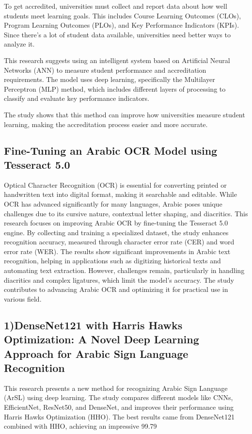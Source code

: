 \documentclass{article}
\begin{document}
To get accredited, universities must collect and report data about how well students meet learning goals. This includes Course Learning Outcomes (CLOs), Program Learning Outcomes (PLOs), and Key Performance Indicators (KPIs). Since there's a lot of student data available, universities need better ways to analyze it.

This research suggests using an intelligent system based on Artificial Neural Networks (ANN) to measure student performance and accreditation requirements. The model uses deep learning, specifically the Multilayer Perceptron (MLP) method, which includes different layers of processing to classify and evaluate key performance indicators.

The study shows that this method can improve how universities measure student learning, making the accreditation process easier and more accurate.
\subsection{Fine-Tuning an Arabic OCR Model using
					Tesseract 5.0}
Optical Character Recognition (OCR) is essential for converting printed or handwritten text into digital format, making it searchable and editable. While OCR has advanced significantly for many languages, Arabic poses unique challenges due to its cursive nature, contextual letter shaping, and diacritics. This research focuses on improving Arabic OCR by fine-tuning the Tesseract 5.0 engine. By collecting and training a specialized dataset, the study enhances recognition accuracy, measured through character error rate (CER) and word error rate (WER). The results show significant improvements in Arabic text recognition, helping in applications such as digitizing historical texts and automating text extraction. However, challenges remain, particularly in handling diacritics and complex ligatures, which limit the model's accuracy. The study contributes to advancing Arabic OCR and optimizing it for practical use in various field.

\subsection{1)DenseNet121 with Harris Hawks Optimization: A Novel Deep Learning Approach for Arabic Sign
						Language Recognition}
This research presents a new method for recognizing Arabic Sign Language (ArSL) using deep learning. The study compares different models like CNNs, EfficientNet, ResNet50, and DenseNet, and improves their performance using Harris Hawks Optimization (HHO). The best results came from DenseNet121 combined with HHO, achieving an impressive 99.79%
\end{document}

